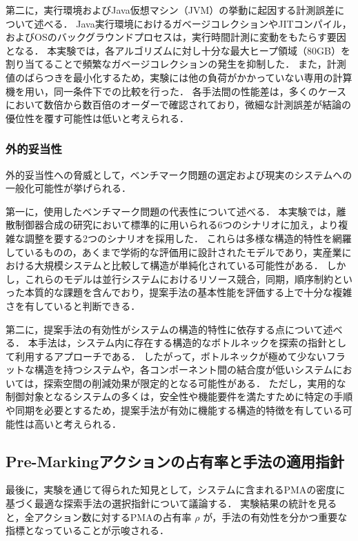 \documentclass[a4paper,11pt,oneside,openany,report,dvipdfmx]{jsbook}
\begin{document}
第二に，実行環境およびJava仮想マシン（JVM）の挙動に起因する計測誤差について述べる．
Java実行環境におけるガベージコレクションやJITコンパイル，およびOSのバックグラウンドプロセスは，実行時間計測に変動をもたらす要因となる．
本実験では，各アルゴリズムに対し十分な最大ヒープ領域（80GB）を割り当てることで頻繁なガベージコレクションの発生を抑制した．
また，計測値のばらつきを最小化するため，実験には他の負荷がかかっていない専用の計算機を用い，同一条件下での比較を行った．
各手法間の性能差は，多くのケースにおいて数倍から数百倍のオーダーで確認されており，微細な計測誤差が結論の優位性を覆す可能性は低いと考えられる．

\subsubsection{外的妥当性}

外的妥当性への脅威として，ベンチマーク問題の選定および現実のシステムへの一般化可能性が挙げられる．

第一に，使用したベンチマーク問題の代表性について述べる．
本実験では，離散制御器合成の研究において標準的に用いられる6つのシナリオに加え，より複雑な調整を要する2つのシナリオを採用した．
これらは多様な構造的特性を網羅しているものの，あくまで学術的な評価用に設計されたモデルであり，実産業における大規模システムと比較して構造が単純化されている可能性がある．
しかし，これらのモデルは並行システムにおけるリソース競合，同期，順序制約といった本質的な課題を含んでおり，提案手法の基本性能を評価する上で十分な複雑さを有していると判断できる．

第二に，提案手法の有効性がシステムの構造的特性に依存する点について述べる．
本手法は，システム内に存在する構造的なボトルネックを探索の指針として利用するアプローチである．
したがって，ボトルネックが極めて少ないフラットな構造を持つシステムや，各コンポーネント間の結合度が低いシステムにおいては，探索空間の削減効果が限定的となる可能性がある．
ただし，実用的な制御対象となるシステムの多くは，安全性や機能要件を満たすために特定の手順や同期を必要とするため，提案手法が有効に機能する構造的特徴を有している可能性は高いと考えられる．

\subsection{Pre-Markingアクションの占有率と手法の適用指針}

最後に，実験を通じて得られた知見として，システムに含まれるPMAの密度に基づく最適な探索手法の選択指針について議論する．
実験結果の統計を見ると，全アクション数に対するPMAの占有率 $\rho$ が，手法の有効性を分かつ重要な指標となっていることが示唆される．
\end{document}
